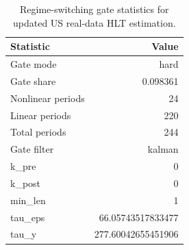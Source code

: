 \begin{table}[htbp]
\centering
\caption{Regime-switching gate statistics for updated US real-data HLT estimation.}
\label{tab:realdata_gate}
\begin{tabular}{lr}
\toprule
Statistic & Value \\
\midrule
Gate mode & hard \\
Gate share & 0.098361 \\
Nonlinear periods & 24 \\
Linear periods & 220 \\
Total periods & 244 \\
Gate filter & kalman \\
k\_pre & 0 \\
k\_post & 0 \\
min\_len & 1 \\
tau\_eps & 66.05743517833477 \\
tau\_y & 277.60042655451906 \\
\bottomrule
\end{tabular}
\end{table}
